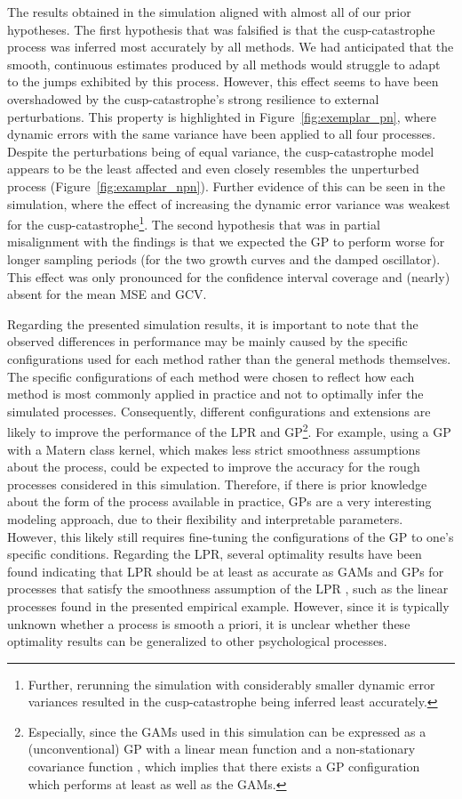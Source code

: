\documentclass[man, floatsintext]{apa7}
\begin{document}
The results obtained in the simulation aligned with almost all of our prior
hypotheses. The first hypothesis that was falsified is that the
cusp-catastrophe process was inferred most accurately by all methods. We had
anticipated that the smooth, continuous estimates produced by all methods would
struggle to adapt to the jumps exhibited by this process. However, this effect
seems to have been overshadowed by the cusp-catastrophe's strong resilience to
external perturbations. This property is highlighted in
Figure~\ref{fig:exemplar_pn}, where dynamic errors with the same variance have
been applied to all four processes. Despite the perturbations being of equal
variance, the cusp-catastrophe model appears to be the least affected and even
closely resembles the unperturbed process (Figure~\ref{fig:examplar_npn}).
Further evidence of this can be seen in the simulation, where the effect of
increasing the dynamic error variance was weakest for the
cusp-catastrophe\footnote{Further, rerunning the simulation with considerably
  smaller dynamic error variances resulted in the cusp-catastrophe being
  inferred
  least accurately.}. The second hypothesis that was in partial misalignment
with
the findings is that we expected the GP to perform worse for longer sampling
periods (for the two growth curves and the damped oscillator). This effect was
only pronounced for the confidence interval coverage and (nearly) absent for
the mean MSE and GCV\@.

Regarding the presented simulation results, it is important to note that the
observed differences in performance may be mainly caused by the specific
configurations used for each method rather than the general methods themselves.
The specific configurations of each method were chosen to reflect how each
method is most commonly applied in practice and not to optimally infer the
simulated processes. Consequently, different configurations and extensions are
likely to improve the performance of the LPR and GP\footnote{Especially, since
  the GAMs used in this simulation can be expressed as a (unconventional) GP
  with
  a linear mean function and a non-stationary covariance function
  \parencite{wahba_improper_1978, rasmussen_gaussian_2006}, which implies that
  there exists a GP configuration which performs at least as well as the
  GAMs.}.
For example, using a GP with a Matern class kernel, which makes less strict
smoothness assumptions about the process, could be expected to improve the
accuracy for the rough processes considered in this simulation. Therefore, if
there is prior knowledge about the form of the process available in practice,
GPs are a very interesting modeling approach, due to their flexibility and
interpretable parameters. However, this likely still requires fine-tuning the
configurations of the GP to one's specific conditions. Regarding the LPR,
several optimality results have been found indicating that LPR should be at
least as accurate as GAMs and GPs for processes that satisfy the smoothness
assumption of the LPR \parencite{fan_local_1997}, such as the linear processes
found in the presented empirical example. However, since it is typically
unknown whether a process is smooth a priori, it is unclear whether these
optimality results can be generalized to other psychological processes.
\end{document}
